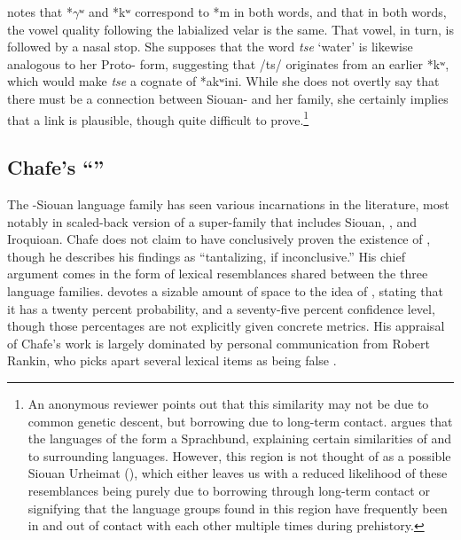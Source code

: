 \documentclass[output=paper]{LSP/langsci}
\begin{document}
\citet{Haas1951,Haas1952} notes that *$\gamma$ʷ and *kʷ correspond to  *m in both words, and that in both words, the vowel quality following the labialized velar is the same. That vowel, in turn, is followed by a nasal stop. She supposes that the  word \emph{tse} `water' is likewise analogous to her Proto- form, suggesting that  /ts/ originates from an earlier *kʷ, which would make  \emph{tse} a cognate of *akʷini. While she does not overtly say that there must be a connection between Siouan- and her  family, she certainly implies that a link is plausible, though quite difficult to prove.\footnote{An anonymous reviewer points out that this similarity may not be due to common genetic descent, but borrowing due to long-term contact. \citet{Kaufman2014} argues that the languages of the  form a Sprachbund, explaining certain similarities of  and  to surrounding languages. However, this region is not thought of as a possible Siouan Urheimat (\citealt[104]{ParksRankin2001}), which either leaves us with a reduced likelihood of these resemblances being purely due to borrowing through long-term contact or signifying that the language groups found in this region have frequently been in and out of contact with each other multiple times during prehistory.}

\subsection{Chafe's ``''}

The -Siouan language family has seen various incarnations in the literature, most notably in  scaled-back version of a super-family that includes Siouan, , and Iroquioan. Chafe does not claim to have conclusively proven the existence of , though he describes his findings as ``tantalizing, if inconclusive.'' His chief argument comes in the form of lexical resemblances shared between the three language families. \citet{Campbell2000} devotes a sizable amount of space to the idea of , stating that it has a twenty percent probability, and a seventy-five percent confidence level, though those percentages are not explicitly given concrete metrics. His appraisal of Chafe's work is largely dominated by personal communication from Robert Rankin, who picks apart several lexical items as being false .
\end{document}
